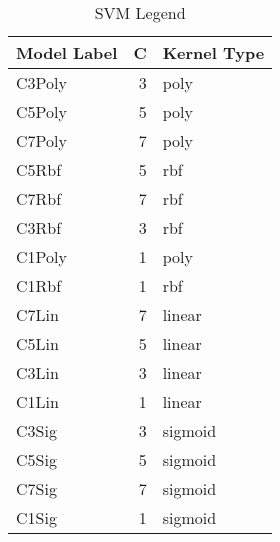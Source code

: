 \begin{table}
\centering
\caption{SVM Legend}
\label{tab:SVM_legend}
\begin{tabular}{lrl}
\toprule
Model Label & C & Kernel Type \\
\midrule
C3Poly & 3 & poly \\
C5Poly & 5 & poly \\
C7Poly & 7 & poly \\
C5Rbf & 5 & rbf \\
C7Rbf & 7 & rbf \\
C3Rbf & 3 & rbf \\
C1Poly & 1 & poly \\
C1Rbf & 1 & rbf \\
C7Lin & 7 & linear \\
C5Lin & 5 & linear \\
C3Lin & 3 & linear \\
C1Lin & 1 & linear \\
C3Sig & 3 & sigmoid \\
C5Sig & 5 & sigmoid \\
C7Sig & 7 & sigmoid \\
C1Sig & 1 & sigmoid \\
\bottomrule
\end{tabular}
\end{table}
